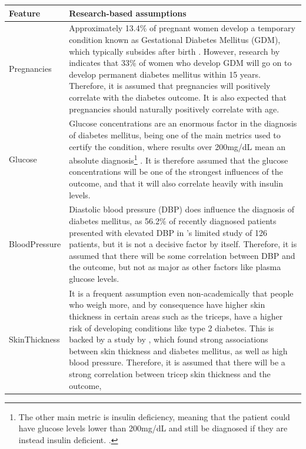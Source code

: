 \documentclass[12pt]{report}
\begin{document}
\begin{longtable}{ | p{} | p{} | }
    \hline
    \cellcolor{blue!25} Feature & \cellcolor{blue!25} Research-based assumptions \\
    \hline
    Pregnancies & Approximately 13.4\% of pregnant women develop a temporary condition known as Gestational 
    Diabetes Mellitus (GDM), which typically subsides after birth \autocite{adam_pregnancy_2023}.
    However, research by \autocite{dennison_absolute_2021} indicates that 33\% of women who develop 
    GDM will go on to develop permanent diabetes mellitus within 15 years. Therefore, it is assumed 
    that pregnancies will positively correlate with the diabetes outcome. It is also expected that 
    pregnancies should naturally positively correlate with age. \\
    \hline
    Glucose & Glucose concentrations are an enormous factor in the diagnosis of diabetes mellitus, being one 
    of the main metrics used to certify the condition, where results over 200mg/dL mean an absolute diagnosis\footnote{The other main metric is insulin deficiency, meaning that the patient could have glucose levels lower than 200mg/dL and still be diagnosed if they are instead insulin deficient. \autocite{aftab_cloud-based_2021}.}
    \autocite{aftab_cloud-based_2021}. It is therefore assumed that the glucose concentrations will be one 
    of the strongest influences of the outcome, and that it will also correlate heavily with insulin levels. \\
    \hline
    BloodPressure & Diastolic blood pressure (DBP) does influence the diagnosis of diabetes mellitus, as 
    56.2\% of recently diagnosed patients presented with elevated DBP in \textcite{nelaj_high_2023}'s limited 
    study of 126 patients, but it is not a decisive factor by itself. Therefore, it is assumed that there will 
    be some correlation between DBP and the outcome, but not as major as other factors like plasma glucose levels.\\
    \hline
    SkinThickness & It is a frequent assumption even non-academically that people who weigh more, and by consequence have higher 
    skin thickness in certain areas such as the triceps, have a higher risk of developing conditions like type 2 diabetes. This is 
    backed by a study by \textcite{ruiz-alejos_skinfold_2020}, which found strong associations between skin thickness and diabetes mellitus,
    as well as high blood pressure. Therefore, it is assumed that there will be a strong correlation between tricep skin thickness and the outcome, 

\end{longtable}
\end{document}
